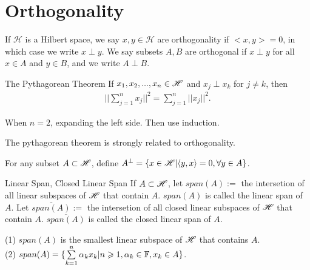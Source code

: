 \chapter{Orthogonality}\label{chp:1_2}


\begin{definition}{}{}
    If $\mathscr{H}$ is a Hilbert space, we say $x,y\in \mathscr{H}$ are orthogonality if $<x,y>=0$, 
    in which case we write $x\perp y$.  We say subsets $A,B$ are orthogonal if $x\perp y$ 
    for all $x\in A$ and $y\in B$, and we write $A\perp B$. 
\end{definition}

\begin{theorem}{The Pythagorean Theorem}{}
    If $x_1,x_2,...,x_n\in\mathscr{H}$ and $x_j\perp x_k$ for $j\neq k$, then
    \begin{align*}
        ||\sum\limits_{j=1}^{n}x_j||^2=\sum\limits_{j=1}^{n}||x_j||^2.
    \end{align*}
\end{theorem}
\begin{proofsolution}
    When $n=2$, expanding the left side.
    Then use induction.
\end{proofsolution}

\begin{remark}
    The pythagorean theorem is strongly related to orthogonality.
\end{remark}


\begin{definition}{}{}
    For any subset $A\subset \mathscr{H}$, define $A^{\perp}=\{x\in \mathscr{H}|\langle y,x\rangle=0,\forall y\in A\}$.  
\end{definition}


\begin{definition}{Linear Span, Closed Linear Span}{}
    If $A\subset \mathscr{H}$, let $span(A):=$ the intersetion of all linear subspaces of $\mathscr{H}$ that contain $A$.
    $span(A)$ is called the linear span of $A$.
    Let $\overline{span(A)}:=$ the intersetion of all closed linear subspaces of $\mathscr{H}$ that contain $A$.
    $\overline{span(A)}$ is called the closed linear span of $A$.
\end{definition}

\begin{proposition}{}{}
    (1) $span(A)$ is the smallest linear subspace of $\mathscr{H}$ that contains $A$.\\
    (2) $span(A)=\{\sum\limits_{k=1}^{n}\alpha_kx_k|n\geqslant 1,\alpha_k\in \mathbb{F},x_k\in A\}$.
\end{proposition}

